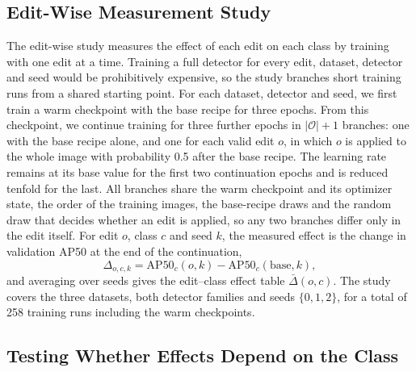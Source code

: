\documentclass[conference]{IEEEtran}
\begin{document}
\subsection{Edit-Wise Measurement Study}
\label{sec:measure_editwise}

The edit-wise study measures the effect of each edit on each class by training with one edit at a time. Training a full detector for every edit, dataset, detector and seed would be prohibitively expensive, so the study branches short training runs from a shared starting point. For each dataset, detector and seed, we first train a warm checkpoint with the base recipe for three epochs. From this checkpoint, we continue training for three further epochs in $|\mathcal{O}|+1$ branches: one with the base recipe alone, and one for each valid edit $o$, in which $o$ is applied to the whole image with probability 0.5 after the base recipe. The learning rate remains at its base value for the first two continuation epochs and is reduced tenfold for the last. All branches share the warm checkpoint and its optimizer state, the order of the training images, the base-recipe draws and the random draw that decides whether an edit is applied, so any two branches differ only in the edit itself. For edit $o$, class $c$ and seed $k$, the measured effect is the change in validation AP50 at the end of the continuation,
\begin{equation}
\Delta_{o,c,k}=\mathrm{AP50}_c(o,k)-\mathrm{AP50}_c(\mathrm{base},k),
\label{eq:delta}
\end{equation}
and averaging over seeds gives the edit--class effect table $\bar\Delta(o,c)$. The study covers the three datasets, both detector families and seeds $\{0,1,2\}$, for a total of 258 training runs including the warm checkpoints.

\subsection{Testing Whether Effects Depend on the Class}
\label{sec:measure_tests}
\end{document}
